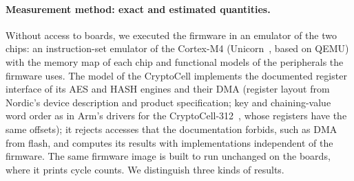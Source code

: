 \paragraph{Measurement method: exact and estimated quantities.}
Without access to boards, we executed the firmware in an emulator of the two
chips: an instruction-set emulator of the Cortex-M4 (Unicorn~\cite{Unicorn},
based on QEMU) with the memory map of each chip and functional models of the
peripherals the firmware uses. The model of the CryptoCell implements the
documented register interface of its AES and HASH engines and their DMA
(register layout from Nordic's device description and product
specification; key and chaining-value word order as in Arm's drivers for the
CryptoCell-312~\cite{TFM-cc3xx}, whose registers have the same offsets); it
rejects accesses that the documentation forbids, such as DMA from flash, and
computes its results with implementations independent of the firmware. The
same firmware image is built to run unchanged on the boards, where it prints
cycle counts. We distinguish three kinds of results.
